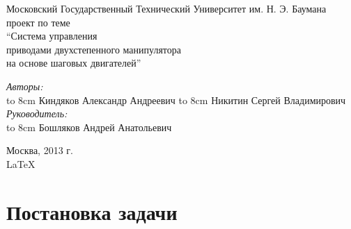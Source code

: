 \documentclass{article}
\begin{document}
\begin{titlepage}
\begin{center}
    {\large Московский Государственный Технический Университет им. Н. Э. Баумана}
    \\[50mm]
    { проект по теме}
    \\[7mm]
    {\LARGE ``Система управления \\ приводами двухстепенного манипулятора \\ на основе шаговых двигателей''}
    \\[37mm]

    \begin{flushright}
        \begin{minipage}{0.5\textwidth}
            \begin{flushleft}
                \textit{Авторы:} \\
                \hbox to 8cm {Киндяков Александр Андреевич \hfil \underline{\hspace{2cm} } }
                \vspace{\baselineskip}
                \hbox to 8cm {Никитин Сергей Владимирович \hfil \underline{\hspace{2cm} } }
                \vspace{2cm}
                \textit{Руководитель:} \\
                \hbox to 8cm {Бошляков Андрей Анатольевич \hfil \underline{\hspace{2cm} } }
            \end{flushleft}
        \end{minipage}
    \end{flushright}

    \vfill %
    Москва, 2013 г. \\
    \LaTeX
\end{center}
\end{titlepage}

\tableofcontents

\newpage


\newpage
\section{Постановка задачи}

\end{document}

